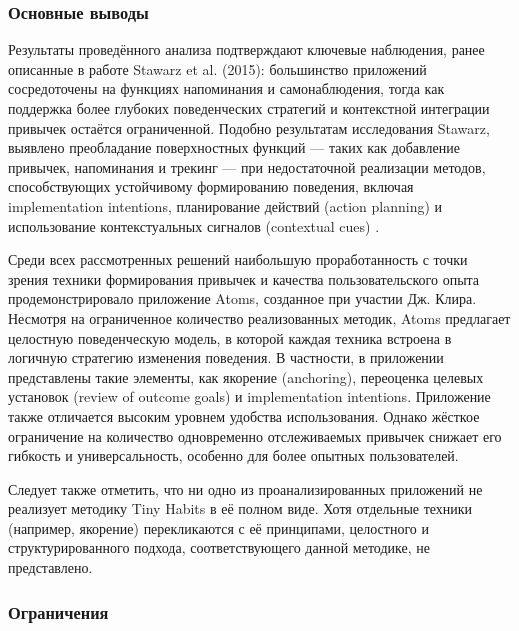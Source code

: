 \documentclass[pdflatex,sn-mathphys-num]{sn-jnl}%
\theoremstyle{thmstyleone}%
\theoremstyle{thmstyletwo}%
\theoremstyle{thmstylethree}%
\begin{document}
\subsubsection{Основные выводы}

Результаты проведённого анализа подтверждают ключевые наблюдения, ранее описанные в работе Stawarz et al. (2015): большинство приложений сосредоточены на функциях напоминания и самонаблюдения, тогда как поддержка более глубоких поведенческих стратегий и контекстной интеграции привычек остаётся ограниченной. Подобно результатам исследования Stawarz, выявлено преобладание поверхностных функций — таких как добавление привычек, напоминания и трекинг — при недостаточной реализации методов, способствующих устойчивому формированию поведения, включая implementation intentions, планирование действий (action planning) и использование контекстуальных сигналов (contextual cues) \cite{stawarz_beyond_2015}.

Среди всех рассмотренных решений наибольшую проработанность с точки зрения техники формирования привычек и качества пользовательского опыта продемонстрировало приложение Atoms, созданное при участии Дж. Клира. Несмотря на ограниченное количество реализованных методик, Atoms предлагает целостную поведенческую модель, в которой каждая техника встроена в логичную стратегию изменения поведения. В частности, в приложении представлены такие элементы, как якорение (anchoring), переоценка целевых установок (review of outcome goals) и implementation intentions. Приложение также отличается высоким уровнем удобства использования. Однако жёсткое ограничение на количество одновременно отслеживаемых привычек снижает его гибкость и универсальность, особенно для более опытных пользователей.

Следует также отметить, что ни одно из проанализированных приложений не реализует методику Tiny Habits в её полном виде. Хотя отдельные техники (например, якорение) перекликаются с её принципами, целостного и структурированного подхода, соответствующего данной методике, не представлено.

\subsubsection{Ограничения}
\end{document}
